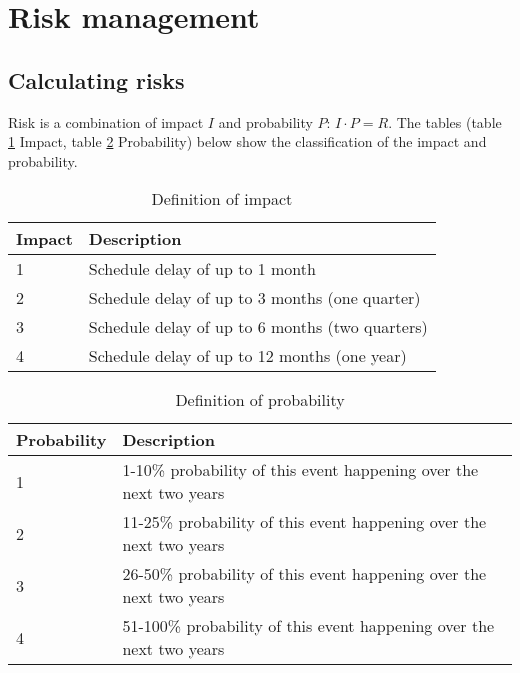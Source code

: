 \section{Risk management}

\subsection{Calculating risks}
Risk is a combination of impact $I$ and probability $P$: $I \cdot P = R$. The tables (table \ref{table:doi} Impact, table \ref{table:dop} Probability) below show the classification of the impact and probability. 

\begin{table}[!htbp]
\centering
\begin{tabular}{| p{3cm} | p{12cm} |}
\hline
Impact & Description \\
\hline
1 &	Schedule delay of up to 1 month \\ 
\hline
2 &	Schedule delay of up to 3 months (one quarter) \\ 
\hline
3 &	Schedule delay of up to 6 months (two quarters) \\ 
\hline
4 &	Schedule delay of up to 12 months (one year) \\ 
\hline
\end{tabular}
\caption{Definition of impact}
\label{table:doi}
\end{table}

\begin{table}[!htbp]
\centering
\begin{tabular}{| p{3cm} | p{12cm} |}
\hline
Probability & Description \\
\hline
1 &	1-10\% probability of this event happening over the next two years \\ 
\hline
2 &	11-25\% probability of this event happening over the next two years \\
\hline
3 &	26-50\% probability of this event happening over the next two years \\
\hline
4 &	51-100\% probability of this event happening over the next two years \\
\hline
\end{tabular}
\caption{Definition of probability}
\label{table:dop}
\end{table}

